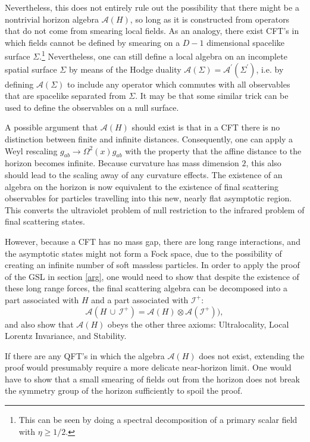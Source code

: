 \documentclass[12pt]{article}
\begin{document}
Nevertheless, this does not entirely rule out the possibility that there might be a nontrivial horizon algebra $\mathcal{A}(H)$, so long as it is constructed from operators that do not come from smearing local fields.  As an analogy, there exist CFT's in which fields cannot be defined by smearing on a $D - 1$ dimensional spacelike surface $\Sigma$.\footnote{This can be seen by doing a spectral decomposition of a primary scalar field with $\eta \ge 1/2$.}  Nevertheless, one can still define a local algebra on an incomplete spatial surface $\Sigma$ by means of the Hodge duality $\mathcal{A}(\Sigma) = \mathcal{A}^\prime(\Sigma^\prime)$, i.e. by defining $\mathcal{A}(\Sigma)$ to include any operator which commutes with all observables that are spacelike separated from $\Sigma$.  It may be that some similar trick can be used to define the observables on a null surface.

A possible argument that $\mathcal{A}(H)$ should exist is that in a CFT there is no distinction between finite and infinite distances.  Consequently, one can apply a Weyl rescaling $g_{ab} \to \Omega^2(x) g_{ab}$ with the property that the affine distance to the horizon becomes infinite.  Because curvature has mass dimension $2$, this also should lead to the scaling away of any curvature effects.  The existence of an algebra on the horizon is now equivalent to the existence of final scattering observables for particles travelling into this new, nearly flat asymptotic region.  This converts the ultraviolet problem of null restriction to the infrared problem of final scattering states.

However, because a CFT has no mass gap, there are long range interactions, and the asymptotic states might not form a Fock space, due to the possibility of creating an infinite number of soft massless particles.  In order to apply the proof of the GSL in section \ref{arg}, one would need to show that despite the existence of these long range forces, the final scattering algebra can be decomposed into a part associated with $H$ and a part associated with $\mathcal{I}^+$:
\begin{equation}
\mathcal{A}(H\,\cup\,\mathcal{I}^+) = \mathcal{A}(H) \otimes \mathcal{A}(\mathcal{I}^+)),
\end{equation}
and also show that $\mathcal{A}(H)$ obeys the other three axioms: Ultralocality, Local Lorentz Invariance, and Stability.

If there are any QFT's in which the algebra $\mathcal{A}(H)$ does not exist, extending the proof would presumably require a more delicate near-horizon limit.  One would have to show that a small smearing of fields out from the horizon does not break the symmetry group of the horizon sufficiently to spoil the proof.
\end{document}
